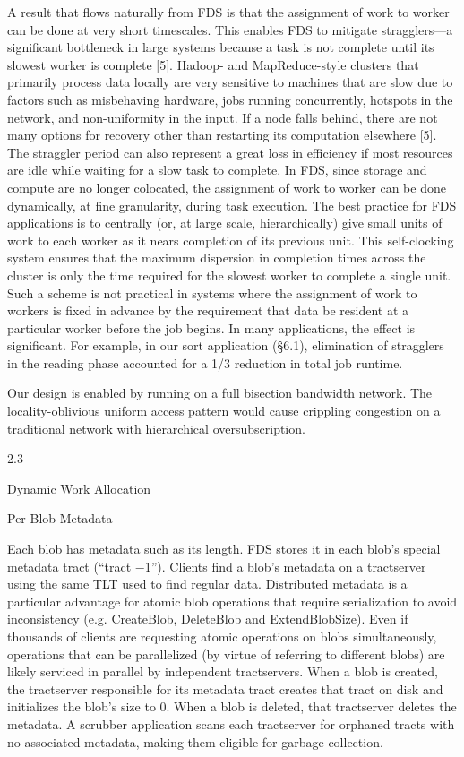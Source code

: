 A result that flows naturally from FDS is that the assignment of work to worker can be done at very short
timescales. This enables FDS to mitigate stragglers—a
significant bottleneck in large systems because a task is
not complete until its slowest worker is complete [5].
Hadoop- and MapReduce-style clusters that primarily
process data locally are very sensitive to machines that
are slow due to factors such as misbehaving hardware,
jobs running concurrently, hotspots in the network, and
non-uniformity in the input. If a node falls behind, there
are not many options for recovery other than restarting
its computation elsewhere [5]. The straggler period can
also represent a great loss in efficiency if most resources
are idle while waiting for a slow task to complete.
In FDS, since storage and compute are no longer colocated, the assignment of work to worker can be done
dynamically, at fine granularity, during task execution.
The best practice for FDS applications is to centrally (or,
at large scale, hierarchically) give small units of work to
each worker as it nears completion of its previous unit.
This self-clocking system ensures that the maximum dispersion in completion times across the cluster is only the
time required for the slowest worker to complete a single
unit. Such a scheme is not practical in systems where the
assignment of work to workers is fixed in advance by the
requirement that data be resident at a particular worker
before the job begins.
In many applications, the effect is significant. For
example, in our sort application (§6.1), elimination of
stragglers in the reading phase accounted for a 1/3 reduction in total job runtime.

Our design is enabled by running on a full bisection
bandwidth network. The locality-oblivious uniform access pattern would cause crippling congestion on a traditional network with hierarchical oversubscription.

2.3

Dynamic Work Allocation

Per-Blob Metadata

Each blob has metadata such as its length. FDS stores
it in each blob’s special metadata tract (“tract −1”).
Clients find a blob’s metadata on a tractserver using
the same TLT used to find regular data. Distributed
metadata is a particular advantage for atomic blob operations that require serialization to avoid inconsistency
(e.g. CreateBlob, DeleteBlob and ExtendBlobSize).
Even if thousands of clients are requesting atomic operations on blobs simultaneously, operations that can be
parallelized (by virtue of referring to different blobs) are
likely serviced in parallel by independent tractservers.
When a blob is created, the tractserver responsible for
its metadata tract creates that tract on disk and initializes
the blob’s size to 0. When a blob is deleted, that tractserver deletes the metadata. A scrubber application scans
each tractserver for orphaned tracts with no associated
metadata, making them eligible for garbage collection.

